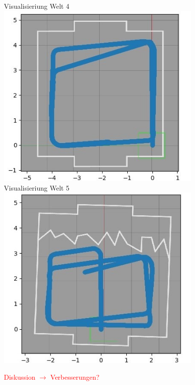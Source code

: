 \documentclass[12pt, a4paper]{report}
\begin{document}
\begin{centering}
Visualisieriung Welt 4\\
\includegraphics[width=290pt]{roboter_pfad4.jpg}\newpage
~\\
Visualisieriung Welt 5\\
\includegraphics[width=290pt]{roboter_pfad5.jpg}\\
\end{centering}


\textcolor{red}{Diskussion $\rightarrow$ Verbesserungen?}
\newline
\end{document}
